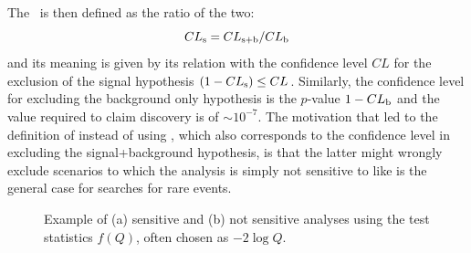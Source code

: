 The \ is then defined as the ratio of the two:
\begin{equation}\label{eq:cls}
\cls{s} = \cls{s+b}/\cls{b}
\end{equation}
and its meaning is given by its relation with the confidence 
level $CL$ for the exclusion of the signal hypothesis 
$(1 - \cls{s}) \leq CL$.
Similarly, the confidence level for excluding the background only
hypothesis is the $p$-value $1 - \cls{b}$ and the value required to claim 
discovery is of $\sim 10^{-7}$. The motivation that led to
the definition of  instead of using , which also
corresponds to the confidence level in excluding the signal+background
hypothesis, is that the latter might wrongly exclude scenarios to
which the analysis is simply not sensitive to like is the general case
for searches for rare events.

\begin{figure}[htb]\begin{center}
	\caption{Example of (a) sensitive and (b) not sensitive analyses using the test 
        statistics $f(Q)$, often chosen as $-2\log Q$.}
\end{center}\end{figure}



